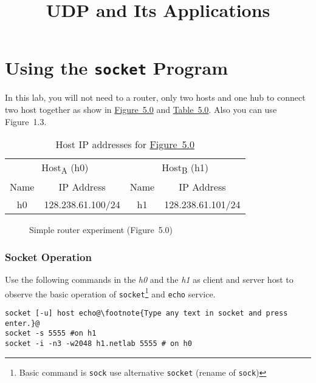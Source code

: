 \documentclass{../UTNetLab}
\title{UDP and Its Applications}
\begin{document}
\part{Using the \texttt{socket} Program}
\label{sec:schema}
    In this lab, you will not need to a router, only two hosts and one hub to connect two host together as show in \hyperref[fig:5.0]{Figure~5.0} and \hyperref[tab:5.0]{Table~5.0}.
    Also you can use Figure~1.3.
    \begin{table}[H]
        \caption{Host IP addresses for \hyperref[fig:5.0]{Figure~5.0}}
        \label{tab:5.0}
        \centering
        \begin{tabular}{ *2c|*2c }
            \hline \hline
            \multicolumn{2}{c|}{Host\textsubscript{A} (h0)} & \multicolumn{2}{c}{Host\textsubscript{B} (h1)} \\
            Name & IP Address & Name & IP Address \\
            \hline 
            h0 & 128.238.61.100/24 & h1 & 128.238.61.101/24\\
            \hline \hline
            \end{tabular}
    \end{table}

    \begin{figure}[H]
        \centering
        \caption{Simple router experiment (Figure~5.0)}        
        \label{fig:5.0}
    \end{figure}

\section{Socket Operation}
    Use the following commands in the \textit{h0} and the \textit{h1} as client and server host to observe the basic operation of \lstinline{socket}\footnote{Basic command is \lstinline{sock} use alternative \lstinline{socket} (rename of \lstinline{sock})} and \lstinline{echo} service.
    \begin{lstlisting}[emph={host, h1,netlab},morekeywords={[3]echo}]
socket [-u] host echo@\footnote{Type any text in socket and press enter.}@
socket -s 5555 #on h1
socket -i -n3 -w2048 h1.netlab 5555 # on h0
    \end{lstlisting}
\end{document}
